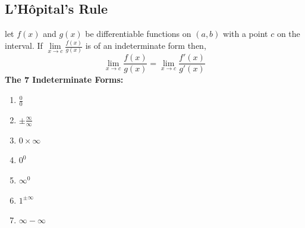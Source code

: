 \documentclass[14pt]{article}
\begin{document}
    \subsection{L'H\^{o}pital's Rule}
    let $f(x)$ and $g(x)$ be differentiable functions on $(a,b)$ with a point $c$ on the interval. If $\lim \limits_{x\rightarrow c}\frac{f(x)}{g(x)}$ is of an indeterminate form then,
    $$\lim \limits_{x \rightarrow c}\frac{f(x)}{g(x)}=\lim \limits_{x \rightarrow c}\frac{f'(x)}{g'(x)}$$
    \textbf{The 7 Indeterminate Forms:}\\
    \begin{enumerate}
        \item $\frac{0}{0}$
        \item $\pm\frac{\infty}{\infty}$
        \item $0\times\infty$
        \item $0^0$
        \item $\infty^0$
        \item $1^{\pm\infty}$
        \item $\infty-\infty$
    \end{enumerate}
\end{document}
